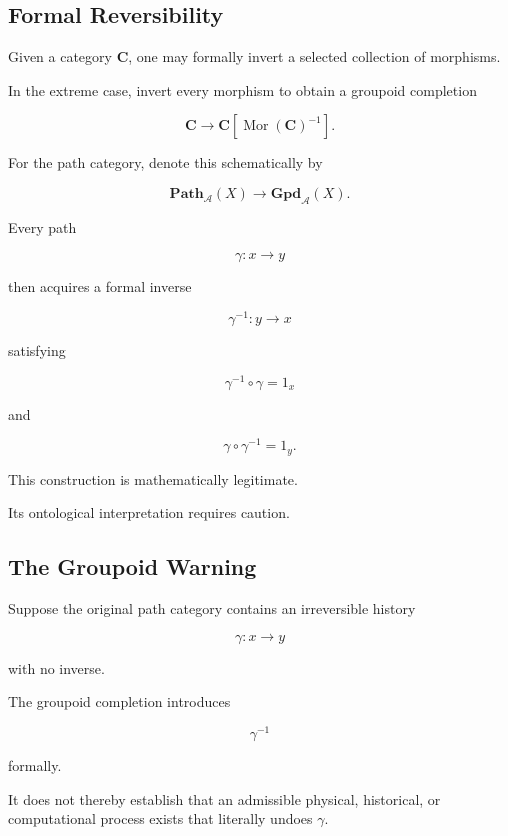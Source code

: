 \documentclass[
  11pt,
  a4paper,
  DIV=12,
  BCOR=0mm,
  parskip=half-
]{scrartcl}
\newcommand{\Mor}{\operatorname{Mor}}
\theoremstyle{definition}
\theoremstyle{plain}
\theoremstyle{remark}
\begin{document}
\subsection{Formal Reversibility}
\label{app:path-groupoid}

Given a category \(\mathbf C\), one may formally invert a selected collection
of morphisms.

In the extreme case, invert every morphism to obtain a groupoid completion

\[
  \mathbf C
  \longrightarrow
  \mathbf C[\Mor(\mathbf C)^{-1}].
\]

For the path category, denote this schematically by

\[
  \mathbf{Path}_{\mathcal A}(X)
  \longrightarrow
  \mathbf{Gpd}_{\mathcal A}(X).
\]

Every path

\[
  \gamma:x\to y
\]

then acquires a formal inverse

\[
  \gamma^{-1}:y\to x
\]

satisfying

\[
  \gamma^{-1}\circ\gamma=1_x
\]

and

\[
  \gamma\circ\gamma^{-1}=1_y.
\]

This construction is mathematically legitimate.

Its ontological interpretation requires caution.


\subsection{The Groupoid Warning}
\label{app:groupoid-warning}

Suppose the original path category contains an irreversible history

\[
  \gamma:x\to y
\]

with no inverse.

The groupoid completion introduces

\[
  \gamma^{-1}
\]

formally.

It does not thereby establish that an admissible physical, historical, or
computational process exists that literally undoes \(\gamma\).
\end{document}
